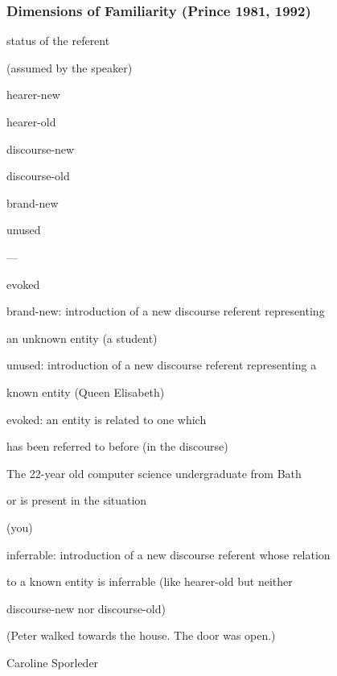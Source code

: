 \documentclass[compress,color=usenames]{beamer}
\begin{document}
\begin{frame}
\frametitle{
Dimensions of Familiarity (Prince 1981, 1992)}



status of the referent



(assumed by the speaker)



hearer-new



hearer-old






discourse-new






discourse-old






brand-new



unused





---



evoked






brand-new: introduction of a new discourse referent representing



an unknown entity (a student)



unused: introduction of a new discourse referent representing a



known entity (Queen Elisabeth)



evoked: an entity is related to one which



has been referred to before (in the discourse)



The 22-year old computer science undergraduate from Bath



or is present in the situation



(you)



inferrable: introduction of a new discourse referent whose relation



to a known entity is inferrable (like hearer-old but neither



discourse-new nor discourse-old)



(Peter walked towards the house. The door was open.)



Caroline Sporleder














\end{frame}
\end{document}

